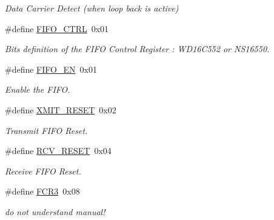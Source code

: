 \begin{DoxyCompactItemize}
\begin{DoxyCompactList}\small\item\em Data Carrier Detect (when loop back is active) \end{DoxyCompactList}\item 
\#define \mbox{\hyperlink{group__i386__uart_gadcd8d113c8791a336768b8da70010ea7}{F\+I\+F\+O\+\_\+\+C\+T\+RL}}~0x01
\begin{DoxyCompactList}\small\item\em Bits definition of the F\+I\+FO Control Register \+: W\+D16\+C552 or N\+S16550. \end{DoxyCompactList}\item 
\mbox{\label{group__i386__uart_ga53954ec7f9dc790f00548da08ccd5ed6}} 
\#define \mbox{\hyperlink{group__i386__uart_ga53954ec7f9dc790f00548da08ccd5ed6}{F\+I\+F\+O\+\_\+\+EN}}~0x01
\begin{DoxyCompactList}\small\item\em Enable the F\+I\+FO. \end{DoxyCompactList}\item 
\mbox{\label{group__i386__uart_gab93e15558dd278aa2bc7450f8f492e0c}} 
\#define \mbox{\hyperlink{group__i386__uart_gab93e15558dd278aa2bc7450f8f492e0c}{X\+M\+I\+T\+\_\+\+R\+E\+S\+ET}}~0x02
\begin{DoxyCompactList}\small\item\em Transmit F\+I\+FO Reset. \end{DoxyCompactList}\item 
\mbox{\label{group__i386__uart_ga398ff8d3e4cc01866ef5267209ee36c7}} 
\#define \mbox{\hyperlink{group__i386__uart_ga398ff8d3e4cc01866ef5267209ee36c7}{R\+C\+V\+\_\+\+R\+E\+S\+ET}}~0x04
\begin{DoxyCompactList}\small\item\em Receive F\+I\+FO Reset. \end{DoxyCompactList}\item 
\mbox{\label{group__i386__uart_ga569aba7498da466d50e1f3d14c17b03b}} 
\#define \mbox{\hyperlink{group__i386__uart_ga569aba7498da466d50e1f3d14c17b03b}{F\+C\+R3}}~0x08
\begin{DoxyCompactList}\small\item\em do not understand manual! \end{DoxyCompactList}\item 

\end{DoxyCompactItemize}
